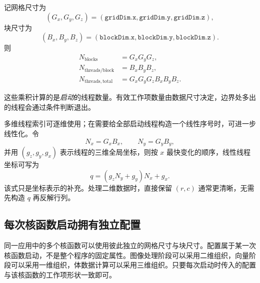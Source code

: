 记网格尺寸为
\[
(G_x,G_y,G_z)
=(\texttt{gridDim.x},\texttt{gridDim.y},\texttt{gridDim.z}),
\]
块尺寸为
\[
(B_x,B_y,B_z)
=(\texttt{blockDim.x},\texttt{blockDim.y},\texttt{blockDim.z}).
\]
则
\[
\begin{aligned}
N_{\mathrm{blocks}} &= G_xG_yG_z,\\
N_{\mathrm{threads/block}} &= B_xB_yB_z,\\
N_{\mathrm{threads,total}} &= G_xG_yG_zB_xB_yB_z.
\end{aligned}
\]

这些乘积计算的是\emph{启动}的线程数量。有效工作项数量由数据尺寸决定，边界处多出的线程会通过条件判断退出。

\begin{derivationbox}[title=三维逻辑坐标的线性化]
多维线程索引可逐维使用；在需要给全部启动线程构造一个线性序号时，可进一步线性化。令
\[
N_x=G_xB_x,\qquad N_y=G_yB_y,
\]
并用 $(g_z,g_y,g_x)$ 表示线程的三维全局坐标，则按 $x$ 最快变化的顺序，线性线程坐标可写为
\[
  q=(g_zN_y+g_y)N_x+g_x.
\]
该式只是坐标表示的补充。处理二维数据时，直接保留 $(r,c)$ 通常更清晰，无需先构造 $q$ 再反解行列。
\end{derivationbox}

\subsection{每次核函数启动拥有独立配置}

同一应用中的多个核函数可以使用彼此独立的网格尺寸与块尺寸。配置属于某一次核函数启动，不是整个程序的固定属性。图像处理阶段可以采用二维组织，向量阶段可以采用一维组织，体数据计算可以采用三维组织。只要每次启动时传入的配置与该核函数的工作项形状一致即可。
